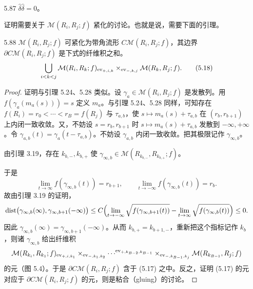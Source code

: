 \begin{theorem}{5.87}
  $\hat\delta\hat\delta=0$。
\end{theorem}

证明需要关于 $\mathcal{M}(R_i,R_j;f)$ 紧化的讨论。也就是说，需要下面的引理。

\begin{lemma*}{5.88}
  $\mathcal{M}(R_i,R_j;f)$ 可紧化为带角流形 $C\mathcal{M}(R_i,R_j;f)$，其边界 $\partial C\mathcal{M}(R_i,R_j;f)$ 是下式的纤维积之和。
  \begin{equation}
    \bigcup_{i<k<j}\mathcal{M}(R_i,R_k;f)_{\operatorname{ev}_{+,i,k}}\times_{\operatorname{ev}_{-,k,j}}\mathcal{M}(R_k,R_j;f). \tag{5.18}
  \end{equation}
\end{lemma*}

\begin{proof}
  证明与引理 5.24、5.28 类似。设 $\gamma_a\in\mathcal{M}(R_i,R_j;f)$ 是发散列。用 $f(\gamma_a(m_a(s)))=s$ 定义 $m_a$。与引理 5.24、5.28 同样，可知存在 $f(R_i)=r_0<\cdots<r_B=f(R_j)$ 与 $\tau_{a,b}$，使 $s\mapsto m_a(s)+\tau_{a,b}$ 在 $(r_b,r_{b+1})$ 上内闭一致收敛。又，不妨设 $s=r_b,r_{b+1}$ 时 $s\mapsto m_a(s)+\tau_{a,b}$ 发散到 $-\infty,+\infty$。令 $\gamma_{a,b}(t)=\gamma_a(t-\tau_{a,b})$。不妨设 $\gamma_{a,b}$ 内闭一致收敛。把其极限记作 $\gamma_{\infty,b}$。

  由引理 3.19，存在 $k_{b,-},k_{b,+}$ 使 $\gamma_{\infty,b}\in\mathcal{M}(R_{k_{b,-}},R_{k_{b,+}};f)$。

  于是
\[
\lim_{t\to\infty}f(\gamma_{\infty,b}(t))=r_{b+1},\qquad
\lim_{t\to-\infty}f(\gamma_{\infty,b}(t))=r_b .
\]
故由引理 3.19 的证明，
\[
\mathrm{dist}\bigl(\gamma_{\infty,b}(\infty),\gamma_{\infty,b+1}(-\infty)\bigr)
\le C\Bigl(\lim_{t\to-\infty}\sqrt{f(\gamma_{\infty,b+1}(t))}
-\lim_{t\to\infty}\sqrt{f(\gamma_{\infty,b}(t))}\Bigr)\le 0 .
\]
因此 $\gamma_{\infty,b}(\infty)=\gamma_{\infty,b+1}(-\infty)$。从而 $k_{b,+}=k_{b+1,-}$，重新把这个指标记作 $k_b$，则诸 $\gamma_{\infty,b}$ 给出纤维积
\[
\mathcal{M}(R_{k_i},R_{k_1};f)_{\operatorname{ev}_{+,i,k_1}}
\times_{\operatorname{ev}_{-,k_1,k_2}}\cdots^{\operatorname{ev}_{+,k_{B-2},k_{B-1}}}
\times_{\operatorname{ev}_{-,k_{B-1},k_j}}\mathcal{M}(R_{k_{B-1}},R_j;f)
\]
的元（图 5.4）。于是 $\partial C\mathcal{M}(R_i,R_j;f)$ 含于 (5.17) 之中。反之，证明 (5.17) 的元对应于 $\partial C\mathcal{M}(R_i,R_j;f)$ 的元，则是粘合（gluing）的讨论。
\end{proof}

